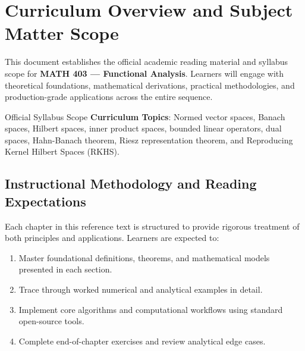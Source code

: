 \section{Curriculum Overview and Subject Matter Scope}

This document establishes the official academic reading material and syllabus scope for \textbf{MATH 403 --- Functional Analysis}. Learners will engage with theoretical foundations, mathematical derivations, practical methodologies, and production-grade applications across the entire sequence.

\begin{InsightBox}{Official Syllabus Scope}
  \textbf{Curriculum Topics}: Normed vector spaces, Banach spaces, Hilbert spaces, inner product spaces, bounded linear operators, dual spaces, Hahn-Banach theorem, Riesz representation theorem, and Reproducing Kernel Hilbert Spaces (RKHS).
\end{InsightBox}

\subsection{Instructional Methodology and Reading Expectations}

Each chapter in this reference text is structured to provide rigorous treatment of both principles and applications. Learners are expected to:
\begin{enumerate}
  \item Master foundational definitions, theorems, and mathematical models presented in each section.
  \item Trace through worked numerical and analytical examples in detail.
  \item Implement core algorithms and computational workflows using standard open-source tools.
  \item Complete end-of-chapter exercises and review analytical edge cases.
\end{enumerate}

